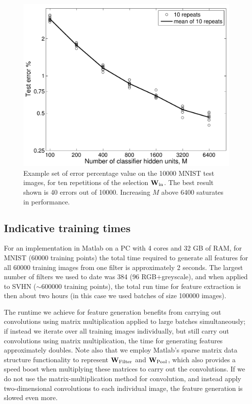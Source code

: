 \documentclass[conference]{IEEEtran}
\begin{document}
\begin{figure}[!ht]
\centering
\includegraphics[width=0.9\columnwidth]{IJCNN_MNIST}
 \caption{Example set of error percentage value on the 10000 MNIST test images, for ten repetitions of the selection ${\bf W}_{\rm in}$. The best result shown is 40 errors out of 10000. Increasing $M$ above 6400 saturates in performance.}
\label{fig_MNIST}
\end{figure}

\subsection{Indicative training times}

For an implementation in Matlab on a PC with 4 cores and 32 GB of RAM, for MNIST (60000 training points) the total time required to generate all features for all 60000 training images from one filter is approximately 2 seconds. The largest number of filters we used to date was 384 (96 RGB+greyscale), and when applied to SVHN ($\sim$600000 training points), the total run time for feature extraction is then about two hours (in this case we used batches of size 100000 images). 

The runtime we achieve for feature generation benefits from carrying out convolutions using matrix multiplication applied to large batches simultaneously; if instead we iterate over all training images individually, but still carry out convolutions using matrix multiplication, the time for generating features approximately doubles.   Note also that we employ Matlab's sparse matrix data structure functionality to represent ${\bf W}_{\rm Filter}$ and ${\bf W}_{\rm Pool}$, which also provides a speed boost when multiplying these matrices to carry out the convolutions.  If we do not use the matrix-multiplication method for convolution, and instead apply two-dimensional convolutions to each individual image, the feature generation is slowed even more.
\end{document}
